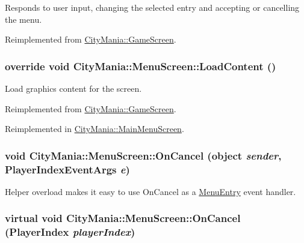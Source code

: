Responds to user input, changing the selected entry and accepting or cancelling the menu. 

Reimplemented from \hyperlink{classCityMania_1_1GameScreen_a80edab75e121f4e08b007f47206cf29c}{CityMania::GameScreen}.\hypertarget{classCityMania_1_1MenuScreen_ad3892ecccfde65f286cebd1f83083cd1}{
\subsubsection[{LoadContent}]{\setlength{\rightskip}{0pt plus 5cm}override void CityMania::MenuScreen::LoadContent ()}}
\label{classCityMania_1_1MenuScreen_ad3892ecccfde65f286cebd1f83083cd1}


Load graphics content for the screen. 

Reimplemented from \hyperlink{classCityMania_1_1GameScreen_a4dc3798784fff49b20280903d796c94c}{CityMania::GameScreen}.

Reimplemented in \hyperlink{classCityMania_1_1MainMenuScreen_a784682ea2036cdefdbbf8ea642f70be0}{CityMania::MainMenuScreen}.\hypertarget{classCityMania_1_1MenuScreen_a89a79a688ebc8fdddf3ee1aabb43dad1}{
\subsubsection[{OnCancel}]{\setlength{\rightskip}{0pt plus 5cm}void CityMania::MenuScreen::OnCancel (object {\em sender}, \/  {\bf PlayerIndexEventArgs} {\em e})}}
\label{classCityMania_1_1MenuScreen_a89a79a688ebc8fdddf3ee1aabb43dad1}


Helper overload makes it easy to use OnCancel as a \hyperlink{classCityMania_1_1MenuEntry}{MenuEntry} event handler. \hypertarget{classCityMania_1_1MenuScreen_adba6d36ac9e5f30e2e3c2147c7510bf0}{
\subsubsection[{OnCancel}]{\setlength{\rightskip}{0pt plus 5cm}virtual void CityMania::MenuScreen::OnCancel (PlayerIndex {\em playerIndex})}}
\label{classCityMania_1_1MenuScreen_adba6d36ac9e5f30e2e3c2147c7510bf0}


